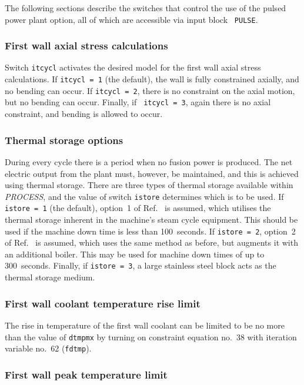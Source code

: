 \documentclass[11pt,a4paper]{report}
\newcommand{\PSC}{\mbox{\it PROCESS},\/ }
\begin{document}
The following sections describe the switches that control the use of the
pulsed power plant option, all of which are accessible via input block {\tt
PULSE}.
\setlength{\parskip}{0mm}

\subsubsection{First wall axial stress calculations}

Switch {\tt itcycl} activates the desired model for the first wall axial
stress calculations. If {\tt itcycl = 1} (the default), the wall is fully
constrained axially, and no bending can occur. If {\tt itcycl = 2}, there is
no constraint on the axial motion, but no bending can occur. Finally, if {\tt
itcycl = 3}, again there is no axial constraint, and bending is allowed to
occur.

\subsubsection{Thermal storage options}

During every cycle there is a period when no fusion power is produced. The net
electric output from the plant must, however, be maintained, and this is
achieved using thermal storage. There are three types of thermal storage
available within \PSC and the value of switch {\tt istore} determines which is
to be used. If {\tt istore = 1} (the default), option~1 of
Ref.~\cite{ELECTROWATT} is assumed, which utilises the thermal storage
inherent in the machine's steam cycle equipment. This should be used if the
machine down time is less than 100~seconds. If {\tt istore = 2}, option~2 of
Ref.~\cite{ELECTROWATT} is assumed, which uses the same method as before, but
augments it with an additional boiler. This may be used for machine down times
of up to 300~seconds. Finally, if {\tt istore = 3}, a large stainless steel
block acts as the thermal storage medium.

\subsubsection{First wall coolant temperature rise limit}

The rise in temperature of the first wall coolant can be limited to be no more
than the value of {\tt dtmpmx} by turning on constraint equation no.\ 38 with
iteration variable no.\ 62 ({\tt fdtmp}).

\subsubsection{First wall peak temperature limit}
\end{document}
